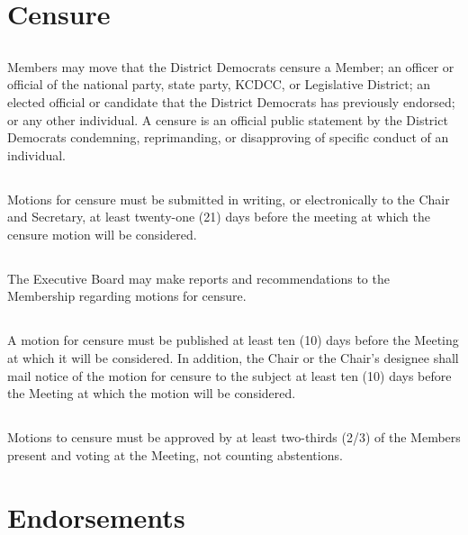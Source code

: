 \section{Censure}
\subsection{}
Members may move that the \fortythird{} District Democrats censure a Member; an officer or official of the national party, state party, KCDCC, or \fortythird{} Legislative District; an elected official or candidate that the \fortythird{} District Democrats has previously endorsed; or any other individual. A censure is an official public statement by the \fortythird{} District Democrats condemning, reprimanding, or disapproving of specific conduct of an individual.

\subsection{}
Motions for censure must be submitted in writing, or electronically to the Chair and Secretary, at least twenty-one (21) days before the meeting at which the censure motion will be considered.

\subsection{}
The Executive Board may make reports and recommendations to the Membership regarding motions for censure.

\subsection{}
A motion for censure must be published at least ten (10) days before the Meeting at which it will be considered. In addition, the Chair or the Chair’s designee shall mail notice of the motion for censure to the subject at least ten (10) days before the Meeting at which the motion will be considered.

\subsection{}
Motions to censure must be approved by at least two-thirds (2/3) of the Members present and voting at the Meeting, not counting abstentions.

\section{Endorsements}
